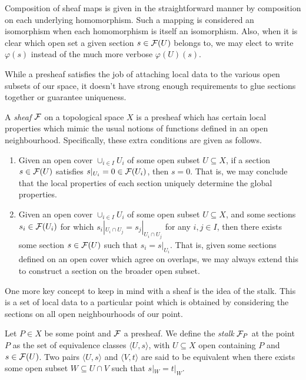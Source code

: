 Composition of sheaf maps is given in the straightforward manner by composition on each underlying homomorphism.
Such a mapping is considered an isomorphism when each homomorphism is itself an isomorphism.
Also, when it is clear which open set a given section $s \in \mathcal{F}(U)$ belongs to, 
we may elect to write $\varphi(s)$ instead of the much more verbose $\varphi(U)(s)$.

While a presheaf satisfies the job of attaching local data to the various open subsets of our space,
it doesn't have strong enough requirements to glue sections together or guarantee uniqueness.

\begin{definition}[Sheaf]
    A \textit{sheaf} $\mathcal{F}$ on a topological space $X$ is a presheaf which has certain local properties which mimic the usual notions of functions defined in an open neighbourhood. Specifically, these extra conditions are given as follows.
    \begin{enumerate}
        \item Given an open cover $\cup_{i \in I} U_i$ of some open subset $U \subseteq X$, 
        if a section $s \in \mathcal{F}(U)$ satisfies $s|_{U_i} = 0 \in \mathcal{F}(U_i)$, then $s = 0$. 
        That is, we may conclude that the local properties of each section uniquely determine the global properties.
        \item Given an open cover $\cup_{i \in I} U_i$ of some open subset $U \subseteq X$, 
        and some sections $s_i \in \mathcal{F}(U_i)$ for which $s_i|_{U_i \cap U_j} = s_j|_{U_i \cap U_j}$ for any $i, j \in I$, 
        then there exists some section $s \in \mathcal{F}(U)$ such that $s_i = s|_{U_i}$.
        That is, given some sections defined on an open cover which agree on overlaps, we may always extend this to construct a section on the broader open subset.
    \end{enumerate}
\end{definition}

One more key concept to keep in mind with a sheaf is the idea of the stalk.
This is a set of local data to a particular point which is obtained by considering the sections on all open neighbourhoods of our point.

\begin{definition}[Stalk]
    Let $P \in X$ be some point and $\mathcal{F}$ a presheaf. 
    We define the \textit{stalk} $\mathcal{F}_P$ at the point $P$ as the set of equivalence classes $\langle U, s \rangle$,
    with $U \subseteq X$ open containing $P$ and $s \in \mathcal{F}(U)$.
    Two pairs $\langle U, s \rangle$ and $\langle V, t \rangle$ are said to be equivalent when there exists some open subset $W \subseteq U \cap V$ such that $s|_W = t|_W$.
\end{definition}

